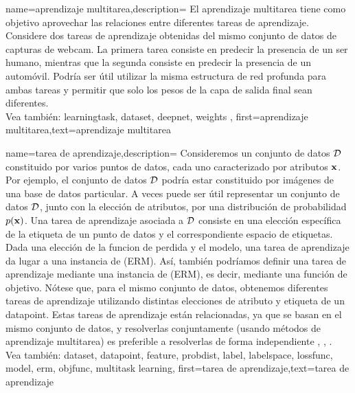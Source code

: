 {name={aprendizaje multitarea},description=
	{El aprendizaje multitarea tiene como objetivo aprovechar las relaciones entre diferentes tareas de aprendizaje. 
	Considere dos tareas de aprendizaje obtenidas del mismo conjunto de datos de capturas de webcam.
	La primera tarea consiste en predecir la presencia de un ser humano, 
	mientras que la segunda consiste en predecir la presencia de un automóvil. Podría ser útil utilizar la misma estructura de red profunda para ambas tareas y permitir que solo los pesos
	de la capa de salida final sean diferentes.
	\\
		Vea también: \gls{learningtask}, \gls{dataset}, \gls{deepnet}, \gls{weights} },
	first={aprendizaje multitarea},text={aprendizaje multitarea}
}

{name={tarea de aprendizaje},description=
	{Consideremos un conjunto de datos $\mathcal{D}$ constituido por varios puntos de datos, cada uno 
	caracterizado por atributos ${\bf x}$. Por ejemplo, el conjunto de datos $\mathcal{D}$ 
	podría estar constituido por imágenes de una base de datos particular. A veces puede ser útil 
	 representar un conjunto de datos $\mathcal{D}$, junto con la elección de atributos, por una distribución de probabilidad $p({\bf x})$. 
	 Una tarea de aprendizaje asociada a $\mathcal{D}$ consiste en una elección específica de la 
	 etiqueta de un punto de datos y el correspondiente espacio de etiquetas. 
	 Dada una elección de la funcion de perdida y el modelo, una tarea de aprendizaje da lugar 
	 a una instancia de (ERM). Así, también podríamos definir una tarea de aprendizaje mediante una instancia de (ERM), es decir, 
	 mediante una función de objetivo. Nótese que, para el mismo conjunto de datos, obtenemos diferentes tareas de aprendizaje utilizando 
	 distintas elecciones de atributo y etiqueta de un datapoint. Estas tareas de aprendizaje  
	 están relacionadas, ya que se basan en el mismo conjunto de datos, y resolverlas conjuntamente 
	 (usando métodos de aprendizaje multitarea) es preferible a resolverlas de forma independiente \cite{Caruana:1997wk}, \cite{JungGaphLassoSPL}, \cite{CSGraphSelJournal}.
	 \\
		Vea también: \gls{dataset}, \gls{datapoint}, \gls{feature}, \gls{probdist}, \gls{label}, \gls{labelspace}, \gls{lossfunc}, \gls{model}, \gls{erm}, \gls{objfunc}, \gls{multitask learning}},
	first={tarea de aprendizaje},text={tarea de aprendizaje}
	}
